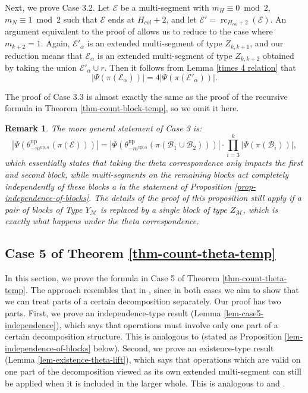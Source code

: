 \documentclass[11pt,letterpaper]{amsart}
\newcommand{\up}{{\mathrm{up}}}
\newcommand{\BB}{\mathcal{B}}
\newcommand{\EE}{\mathcal{E}}
\newcommand{\rc}{\operatorname{rc}}
\newtheorem{rmk}[thm]{Remark}
\numberwithin{equation}{section}
\begin{document}
Next, we prove Case 3.2. Let $\mathcal{E}$ be a multi-segment with $m_H \equiv 0 \bmod{2}$, $m_N \equiv 1 \bmod{2}$ such that $\EE$ ends at $H_{col}+2$, and let $\EE' = \rc_{H_{col}+2}(\EE).$ An argument equivalent to the proof of \cite[Lemma 6.8]{HKT26} allows us to reduce to the case where $m_{k + 2} = 1.$ Again, $\mathcal{E}'_\alpha$ is an extended multi-segment of type $Z_{k, k+ 1}$, and our reduction means that  $\mathcal{E}_\alpha$ is an extended multi-segment of type $Z_{k, k + 2}$ obtained by taking the union $\mathcal{E}'_\alpha \cup r.$ Then it follows from Lemma \ref{times 4 relation} that
$$|\Psi(\pi(\mathcal{E}_\alpha))| = 4 |\Psi(\pi(\mathcal{E}'_\alpha))|.$$

The proof of Case 3.3 is almost exactly the same as the proof of the recursive formula in Theorem \ref{thm-count-block-temp}, so we omit it here.

\begin{rmk}
    The more general statement of Case 3 is:
    \[|\Psi(\theta^\up_{-m^{\up, \alpha}}(\pi(\EE)))| = |\Psi(\theta^\up_{-m^{\up, \alpha}}(\pi(\BB_1 \cup \BB_2)))| \cdot \prod_{i=3}^k |\Psi(\pi(\BB_i))|,\]
    which essentially states that taking the theta correspondence only impacts the first and second block, while multi-segments on the remaining blocks act completely independently of these blocks a la the statement of Proposition \ref{prop-independence-of-blocks}. The details of the proof of this proposition still apply if a pair of blocks of Type $Y_{\mathcal{M}}$ is replaced by a single block of type $Z_{\mathcal{M}}$, which is exactly what happens under the theta correspondence.
\end{rmk}



\subsection{Case 5 of Theorem \ref{thm-count-theta-temp}}\label{sec case 5}

In this section, we prove the formula in Case 5 of Theorem \ref{thm-count-theta-temp}. The approach resembles that in \cite[\S 7]{HKT26}, since in both cases we aim to show that we can treat parts of a certain decomposition separately. Our proof has two parts. First, we prove an independence-type result (Lemma \ref{lem-case5-independence}), which says that operations must involve only one part of a certain decomposition structure. This is analogous to \cite[Lemma 7.12]{HKT26} (stated as Proposition \ref{lem-independence-of-blocks} below). Second, we prove an existence-type result (Lemma \ref{lem-existence-theta-lift}), which says that operations which are valid on one part of the decomposition viewed as its own extended multi-segment can still be applied when it is included in the larger whole. This is analogous to \cite[Lemma 7.6]{HKT26} and \cite[Lemma 7.7]{HKT26}.
\end{document}
